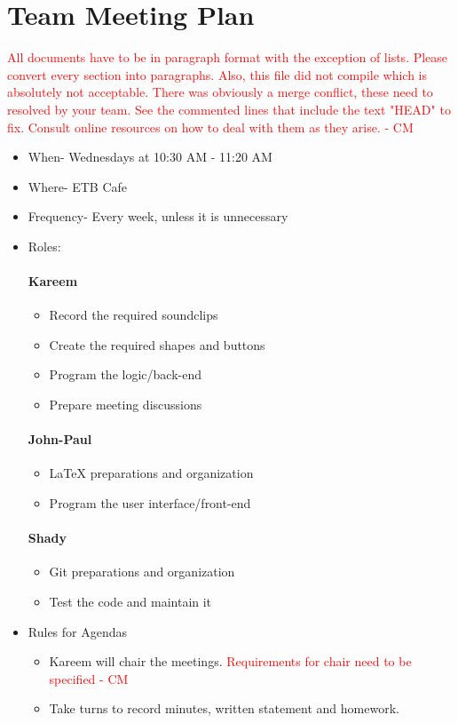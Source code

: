 \documentclass{article}
\begin{document}
\section{Team Meeting Plan}
\textcolor{red}{ All documents have to be in paragraph format with the exception of lists. Please convert every section into paragraphs. Also, this file did not compile which is absolutely not acceptable. There was obviously a merge conflict, these need to resolved by your team. See the commented lines that include the text "HEAD" to fix. Consult online resources on how to deal with them as they arise.  - CM} \\
\begin{itemize}
\item When- Wednesdays at 10:30 AM - 11:20 AM
\item Where- ETB Cafe
\item Frequency- Every week, unless it is unnecessary 
\item Roles:
\paragraph{Kareem}
\begin{itemize}
\item Record the required soundclips
\item Create the required shapes and buttons
\item Program the logic/back-end
\item Prepare meeting discussions
\end{itemize}
\paragraph{John-Paul}
\begin{itemize}
\item LaTeX preparations and organization
\item Program the user interface/front-end
\end{itemize}
\paragraph{Shady}
\begin{itemize}
\item Git preparations and organization
\item Test the code and maintain it
\end{itemize}
\item Rules for Agendas
\begin{itemize}
\item Kareem will chair the meetings. \textcolor{red}{Requirements for chair need to be specified - CM} \\
\item Take turns to record minutes, written statement and homework.
\end{itemize}
\end{itemize}
\end{document}
